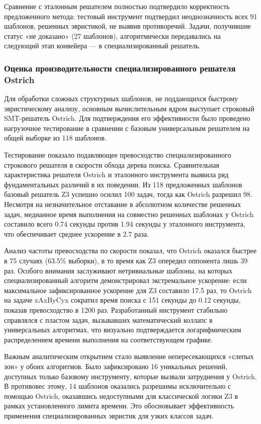 \documentclass[14pt, russian]{scrartcl}
\begin{document}
Сравнение с эталонным решателем полностью подтвердило корректность предложенного метода: тестовый инструмент подтвердил неоднозначность всех 91 шаблонов, решенных эвристикой, не выявив противоречий. Задачи, получившие статус «не доказано» (27 шаблонов), алгоритмически передавались на следующий этап конвейера --- в специализированный решатель.



\subsubsection{Оценка производительности специализированного решателя Ostrich}

Для обработки сложных структурных шаблонов, не поддающихся быстрому эвристическому анализу, основным вычислительным ядром выступает строковый SMT-решатель Ostrich. Для подтверждения его эффективности было проведено нагрузочное тестирование в сравнении с базовым универсальным решателем на общей выборке из 118 шаблонов.

Тестирование показало подавляющее превосходство специализированного строкового решателя в скорости обхода дерева поиска. Сравнительная характеристика решателя Ostrich и эталонного инструмента выявила ряд фундаментальных различий в их поведении. Из 118 предложенных шаблонов базовый решатель Z3 успешно осилил 100 задач, тогда как Ostrich разрешил 98. Несмотря на незначительное отставание в абсолютном количестве решенных задач, медианное время выполнения на совместно решенных шаблонах у Ostrich составило всего 0.74 секунды против 1.94 секунды у эталонного инструмента, что обеспечивает среднее ускорение в 2.7 раза. 

Анализ частоты превосходства по скорости показал, что Ostrich оказался быстрее в 75 случаях (63.5\% выборки), в то время как Z3 опередил оппонента лишь 39 раз. Особого внимания заслуживают нетривиальные шаблоны, на которых специализированный алгоритм демонстрировал экстремальное ускорение: если максимальное зафиксированное ускорение для Z3 составило 17.5 раз, то Ostrich на задаче xAxByCyx сократил время поиска с 151 секунды до 0.12 секунды, показав превосходство в 1200 раз. Разработанный инструмент стабильно справлялся с пластом задач, вызывавших математический коллапс в универсальных алгоритмах, что визуально подтверждается логарифмическим распределением времени выполнения на соответствующем графике. 

Важным аналитическим открытием стало выявление непересекающихся «слепых зон» у обоих алгоритмов. Было зафиксировано 16 уникальных решений, доступных только базовому инструменту, которые вызвали затруднения у Ostrich. В противовес этому, 14 шаблонов оказались разрешимы исключительно с помощью Ostrich, оказавшись недоступными для классической логики Z3 в рамках установленного лимита времени. Это обосновывает эффективность применения специализированных эвристик для узких классов задач.
\end{document}
